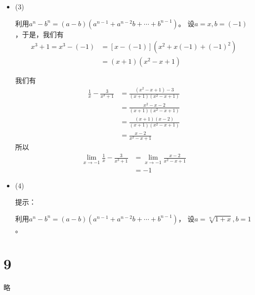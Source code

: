 \documentclass{article}
\begin{document}
\begin{itemize}
  \item (3)

        利用$a^n - b^n = (a - b)(a^{n-1} + a^{n-2}b + \cdots + b^{n-1})$。
        设$a = x, b = (-1)$，于是，我们有
        \begin{align*}
          x^3 + 1 = x^3 - (-1)
           & = [x - (-1)](x^2 + x(-1) + (-1)^2) \\
           & = (x + 1)(x^2 - x + 1)
        \end{align*}

        我们有
        \begin{align*}
          \frac{1}{x} - \frac{3}{x^3 + 1}
           & = \frac{(x^2 - x + 1) - 3}{(x+1)(x^2 - x + 1)} \\
           & = \frac{x^2 - x - 2}{(x+1)(x^2 - x + 1)}       \\
           & = \frac{(x+1)(x - 2)}{(x+1)(x^2 - x + 1)}      \\
           & = \frac{x - 2}{x^2 - x + 1}
        \end{align*}
        所以
        \begin{align*}
          \lim\limits_{x \to -1} \frac{1}{x} - \frac{3}{x^3 + 1}
           & = \lim\limits_{x \to -1} \frac{x - 2}{x^2 - x + 1} \\
           & = -1
        \end{align*}

  \item (4)

        提示：

        利用$a^n - b^n = (a - b)(a^{n-1} + a^{n-2}b + \cdots + b^{n-1})$，
        设$a = \sqrt[n]{1 + x}, b = 1$。
\end{itemize}

\section*{9}
略
\end{document}
